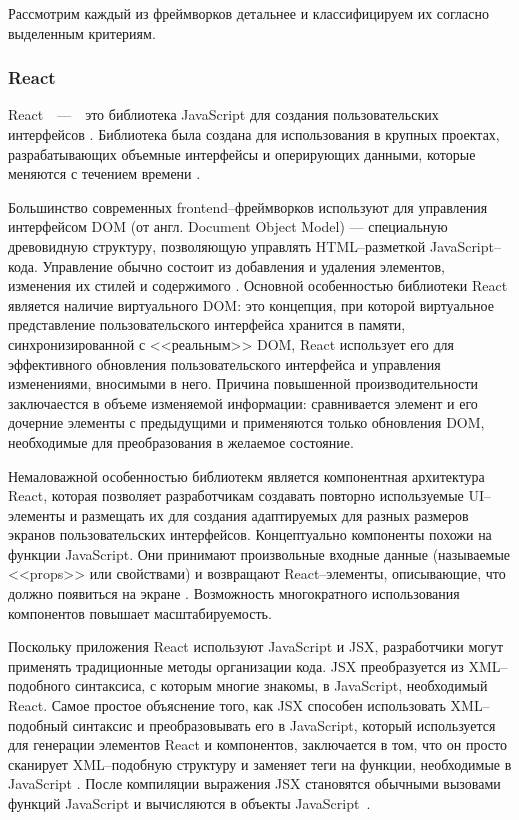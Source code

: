 Рассмотрим каждый из фреймворков детальнее и классифицируем их согласно выделенным критериям.


\subsubsection{React} 

React~~---~~это библиотека JavaScript для создания пользовательских интерфейсов \cite{react}. 
Библиотека была создана для использования в крупных проектах, разрабатывающих объемные интерфейсы и оперирующих данными, которые меняются с течением времени \cite{react-doc}.

Большинство современных frontend--фреймворков используют для управления интерфейсом DOM (от англ. Document Object Model) --- специальную древовидную структуру, позволяющую управлять HTML--разметкой JavaScript--кода. Управление обычно состоит из добавления и удаления элементов, изменения их стилей и содержимого \cite{real-dom}. 
Основной особенностью библиотеки React является наличие виртуального DOM: это концепция, при которой виртуальное представление пользовательского интерфейса хранится в памяти, синхронизированной с <<реальным>> DOM, React использует его для эффективного обновления пользовательского интерфейса и управления изменениями, вносимыми в него. 
Причина повышенной производительности заключаестся в объеме изменяемой информации: сравнивается элемент и его дочерние элементы с предыдущими и применяются только обновления DOM, необходимые для преобразования в желаемое состояние.

Немаловажной особенностью библиотекм является компонентная архитектура React, которая позволяет разработчикам создавать повторно используемые UI--элементы и размещать их для создания адаптируемых для разных размеров экранов пользовательских интерфейсов.
Концептуально компоненты похожи на функции JavaScript. Они принимают произвольные входные данные (называемые <<props>> или свойствами) и возвращают React--элементы, описывающие, что должно появиться на экране \cite{react-doc}.
Возможность многократного использования компонентов повышает масштабируемость.

Поскольку приложения React используют JavaScript и JSX, разработчики могут применять традиционные методы организации кода. 
JSX преобразуется из XML--подобного синтаксиса, с которым многие знакомы, в JavaScript, необходимый React.
Самое простое объяснение того, как JSX способен использовать XML--подобный синтаксис и преобразовывать его в JavaScript, который используется для генерации элементов React и компонентов, заключается в том, что он просто сканирует XML--подобную структуру и заменяет теги на функции, необходимые в JavaScript \cite{react-book}.
После компиляции выражения JSX становятся обычными вызовами функций JavaScript и вычисляются в объекты JavaScript~\cite{react-doc}.

